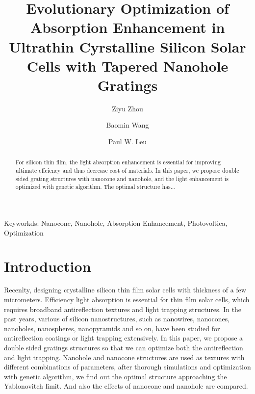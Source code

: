 \documentclass[journal=jacsat,manuscript=article]{achemso}
\author{Ziyu Zhou}
\author{Baomin Wang}
\author{Paul W. Leu}
\affiliation{Department of Instrial Engineering, University of Pittsburgh, Pittsburgh, PA, 15232}
\title
  {Evolutionary Optimization of Absorption Enhancement in Ultrathin Cyrstalline Silicon Solar Cells with Tapered Nanohole Gratings}
\begin{document}

\begin{abstract}
  For silicon thin film, the light absorption enhancement is essential for improving ultimate effciency and thus decrease cost of materials. In this paper, we propose double sided grating structures with nanocone and nanohole, and the light enhancement is optimized with genetic algorithm. The optimal structure has...

\end{abstract}
Keyworkds: Nanocone, Nanohole, Absorption Enhancement, Photovoltica, Optimization
\section{Introduction}
  Recenlty, designing crystalline silicon thin film solar cells with thickness of a few micrometers. Efficiency light absorption is essential for thin film solar cells, which requires broadband antireflection textures and light trapping structures. In the past years, various of silicon nanostructures, such as nanowires, nanocones, nanoholes, nanospheres, nanopyramids and so on, have been studied for antireflection coatings or light trapping extensively. In this paper, we propose a double 	sided gratings structures so that we can optimize both the antireflection and light trapping. Nanohole and nanocone structures are used as textures with different combinations of parameters, after thorough simulations and optimization with genetic algorithm, we find out the optimal structure approaching the Yablonovitch limit. And also the effects of nanocone and nanohole are compared. 
\end{document}
